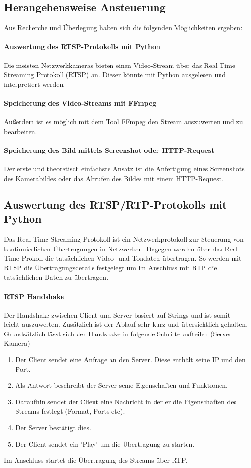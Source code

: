 \subsection{Herangehensweise Ansteuerung}
Aus Recherche und Überlegung haben sich die folgenden Möglichkeiten ergeben:

\paragraph{Auswertung des RTSP-Protokolls mit Python}
Die meisten Netzwerkkameras bieten einen Video-Stream über das Real Time Streaming Protokoll (RTSP) an. Dieser könnte mit Python ausgelesen und interpretiert werden. 

\paragraph{Speicherung des Video-Streams mit FFmpeg}
Außerdem ist es möglich mit dem Tool FFmpeg den Stream auszuwerten und zu bearbeiten.

\paragraph{Speicherung des Bild mittels Screenshot oder HTTP-Request}
Der erste und theoretisch einfachste Ansatz ist die Anfertigung eines Screenshots des Kamerabildes oder das Abrufen des Bildes mit einem HTTP-Request.  

\subsection{Auswertung des RTSP/RTP-Protokolls mit Python}
Das Real-Time-Streaming-Protokoll ist ein Netzwerkprotokoll zur Steuerung von kontinuierlichen Übertragungen in Netzwerken. Dagegen werden über das Real-Time-Prokoll die tatsächlichen Video- und Tondaten übertragen. So werden mit RTSP die Übertragungsdetails festgelegt um im Anschluss mit RTP die tatsächlichen Daten zu übertragen. \\
\paragraph{RTSP Handshake}
Der Handshake\cite[S.19ff]{rtsp-rfc2326} zwischen Client und Server basiert auf Strings und ist somit leicht auszuwerten. Zusätzlich ist der Ablauf sehr kurz und übersichtlich gehalten.
Grundsätzlich lässt sich der Handshake in folgende Schritte aufteilen (Server = Kamera):
\begin{enumerate}
	\item Der Client sendet eine Anfrage an den Server. Diese enthält seine IP und den Port.
	\item Als Antwort beschreibt der Server seine Eigenschaften und Funktionen. 
	\item Daraufhin sendet der Client eine Nachricht in der er die Eigenschaften des Streams festlegt (Format, Ports etc).
	\item Der Server bestätigt dies.
	\item Der Client sendet ein 'Play' um die Übertragung zu starten. 
\end{enumerate}
Im Anschluss startet die Übertragung des Streams über RTP.

